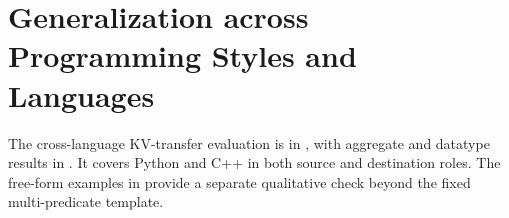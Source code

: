\section{Generalization across Programming Styles and Languages}
\label{app:cpp}
The cross-language KV-transfer evaluation is in , with aggregate and datatype results in . It covers Python and C++ in both source and destination roles. The free-form examples in  provide a separate qualitative check beyond the fixed multi-predicate template.
